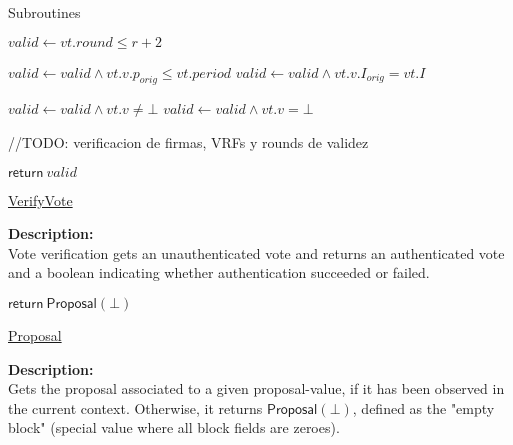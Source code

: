 \documentclass[10pt,a4paper]{article}
\begin{document}
\begin{section}{Subroutines}

\begin{algorithm}[H]\label{algo:verify-vote}
    \begin{algorithmic}[1]
        \State $valid \gets vt.round \leq r+2$
        
            \State $valid \gets valid \land vt.v.p_{orig} \leq vt.period$
                \State $valid \gets valid \land vt.v.I_{orig} = vt.I$
            \EndIf
        \EndIf
        
            \State $valid \gets valid \land vt.v \neq \bot$
            \State $valid \gets valid \land vt.v = \bot$
        \EndIf


        //TODO: verificacion de firmas, VRFs y rounds de validez

        \State $\mathsf{return} \ valid$
    \EndFunction
    \end{algorithmic}
    \caption{\underline{VerifyVote}}
\end{algorithm}

\noindent \textbf{Description:}\\
Vote verification gets an unauthenticated vote and returns an authenticated vote and a
boolean indicating whether authentication succeeded or failed.



\begin{algorithm}[H]
    \begin{algorithmic}[1]

        \State $\mathsf{return} \ \mathsf{Proposal}(\bot) $
    \EndIf

    \EndFunction
    \end{algorithmic}
    \caption{\underline{Proposal}}
\end{algorithm}

\noindent \textbf{Description:}\\ Gets the proposal associated to a given proposal-value, 
if it has been observed in the current context.
Otherwise, it returns $\mathsf{Proposal}(\bot)$, defined as the "empty block" (special value where all
block fields are zeroes).


\end{section}
\end{document}
